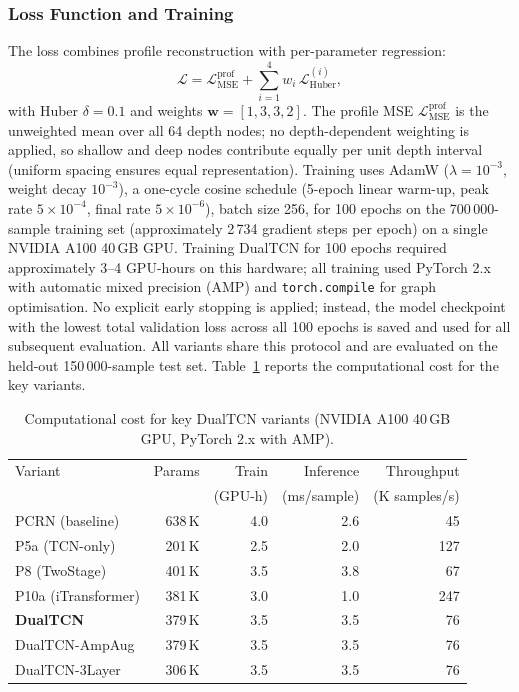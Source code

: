 \documentclass[journal]{IEEEtran}
\begin{document}
\subsubsection{Loss Function and Training}

The loss combines profile reconstruction with per-parameter
regression:
\begin{equation}
  \mathcal{L} = \mathcal{L}_\mathrm{MSE}^\mathrm{prof}
    + \sum_{i=1}^{4} w_i \,
      \mathcal{L}_\mathrm{Huber}^{(i)},
  \label{eq:loss}
\end{equation}
with Huber $\delta = 0.1$ and weights
$\mathbf{w} = [1, 3, 3, 2]$.
The profile MSE $\mathcal{L}_\mathrm{MSE}^\mathrm{prof}$ is the
unweighted mean over all 64 depth nodes; no depth-dependent weighting
is applied, so shallow and deep nodes contribute equally per unit
depth interval (uniform spacing ensures equal representation). Training uses AdamW
($\lambda = 10^{-3}$, weight decay $10^{-3}$), a one-cycle cosine
schedule (5-epoch linear warm-up, peak rate $5 \times 10^{-4}$,
final rate $5 \times 10^{-6}$), batch size 256, for 100 epochs on
the 700\,000-sample training set (approximately 2\,734 gradient
steps per epoch) on a single NVIDIA A100 40\,GB GPU. Training
DualTCN for 100 epochs required approximately 3--4 GPU-hours on this
hardware; all training used PyTorch 2.x with automatic mixed
precision (AMP) and \texttt{torch.compile} for graph optimisation.
No explicit early stopping is applied; instead, the model
checkpoint with the lowest total validation loss across all 100
epochs is saved and used for all subsequent evaluation. All variants
share this protocol and are evaluated on the held-out
150\,000-sample test set.  Table~\ref{tab:compute} reports the
computational cost for the key variants.

\begin{table}[t]
  \centering
  \footnotesize
  \caption{Computational cost for key DualTCN variants
  (NVIDIA A100 40\,GB GPU, PyTorch 2.x with AMP).}
  \label{tab:compute}
  \begin{tabular}{lrrrr}
    \toprule
    Variant & Params & Train & Inference & Throughput \\
            &        & (GPU-h) & (ms/sample) & (K samples/s) \\
    \midrule
    PCRN (baseline)     & 638\,K & 4.0 & 2.6 &  45 \\
    P5a (TCN-only)      & 201\,K & 2.5 & 2.0 & 127 \\
    P8 (TwoStage)       & 401\,K & 3.5 & 3.8 &  67 \\
    P10a (iTransformer) & 381\,K & 3.0 & 1.0 & 247 \\
    \textbf{DualTCN}    & 379\,K & 3.5 & 3.5 &  76 \\
    DualTCN-AmpAug      & 379\,K & 3.5 & 3.5 &  76 \\
    DualTCN-3Layer      & 306\,K & 3.5 & 3.5 &  76 \\
    \bottomrule
  \end{tabular}
\end{table}
\end{document}
